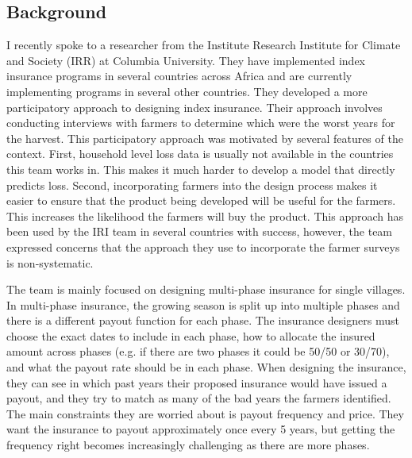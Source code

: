 \documentclass[11pt]{article}
\begin{document}
  \subsection{Background}
    I recently spoke to a researcher from the Institute Research Institute for Climate and Society (IRR) at Columbia University. They have implemented index insurance programs in several countries across Africa and are currently implementing programs in several other countries. They developed a more participatory approach to designing index insurance. Their approach involves conducting interviews with farmers to determine which were the worst years for the harvest. This participatory approach was motivated by several features of the context. First, household level loss data is usually not available in the countries this team works in. This makes it much harder to develop a model that directly predicts loss. Second, incorporating farmers into the design process makes it easier to ensure that the product being developed will be useful for the farmers. This increases the likelihood the farmers will buy the product. This approach has been used by the IRI team in several countries with success, however, the team expressed concerns that the approach they use to incorporate the farmer surveys is non-systematic. 

    The team is mainly focused on designing multi-phase insurance for single villages. In multi-phase insurance, the growing season is split up into multiple phases and there is a different payout function for each phase. The insurance designers must choose the exact dates to include in each phase, how to allocate the insured amount across phases (e.g. if there are two phases it could be 50/50 or 30/70), and what the payout rate should be in each phase. When designing the insurance, they can see in which past years their proposed insurance would have issued a payout, and they try to match as many of the bad years the farmers identified. The main constraints they are worried about is payout frequency and price. They want the insurance to payout approximately once every 5 years, but getting the frequency right becomes increasingly challenging as there are more phases. 
\end{document}
